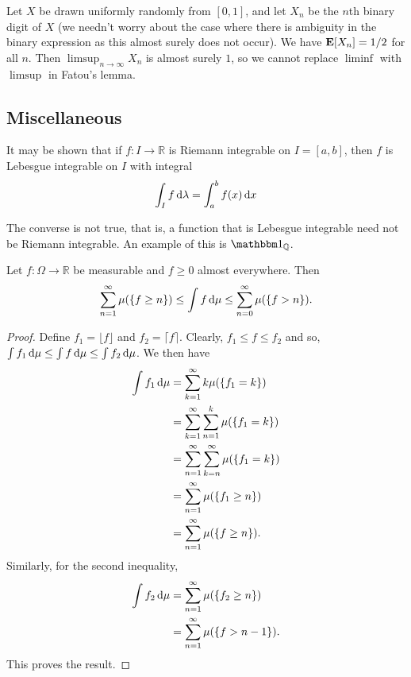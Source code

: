 Let $X$ be drawn uniformly randomly from $[0,1]$, and let $X_n$ be the $n$th binary digit of $X$ (we needn't worry about the case where there is ambiguity in the binary expression as this almost surely does not occur). We have $\textbf{E}
[X_n]=1/2$ for all $n$. Then $\limsup_{n\to\infty}X_n$ is almost surely $1$, so we cannot replace $\liminf$ with $\limsup$ in Fatou's lemma.

\subsection{Miscellaneous}

It may be shown that if $f:I\to\mathbb{R}$ is Riemann integrable on $I=[a,b]$, then $f$ is Lebesgue integrable on $I$ with integral
$$\int_I f\operatorname{d}\!{\lambda} = \int_a^b f(x)\operatorname{d}\!{x}$$

The converse is not true, that is, a function that is Lebesgue integrable need not be Riemann integrable. An example of this is $\indic_\mathbb{Q}$.

\begin{theorem}
\label{geq leq int leq g}
    Let $f:\Omega\to\mathbb{R}$ be measurable and $f\geq 0$ almost everywhere. Then
    $$\sum_{n=1}^\infty \mu(\{f\geq n\})\leq \int f\operatorname{d}\!{\mu} \leq \sum_{n=0}^\infty \mu(\{f>n\}).$$
\end{theorem}
\begin{proof}
    Define $f_1=\lfloor f\rfloor$ and $f_2=\lceil f\rceil$. Clearly, $f_1\leq f\leq f_2$ and so, $\int f_1\operatorname{d}\!{\mu}\leq \int f\operatorname{d}\!{\mu}\leq \int f_2\operatorname{d}\!{\mu}$. We then have
    \begin{align*}
        \int f_1\operatorname{d}\!{\mu} &= \sum_{k=1}^\infty k\mu(\{f_1=k\}) \\
        &= \sum_{k=1}^\infty \sum_{n=1}^k \mu(\{f_1=k\}) \\
        &= \sum_{n=1}^\infty \sum_{k=n}^\infty \mu(\{f_1=k\}) \\
        &= \sum_{n=1}^\infty \mu(\{f_1\geq n\}) \\
        &= \sum_{n=1}^\infty \mu(\{f\geq n\}).
    \end{align*}
    Similarly, for the second inequality,
    \begin{align*}
        \int f_2\operatorname{d}\!{\mu} &= \sum_{n=1}^\infty \mu(\{f_2\geq n\}) \\
        &= \sum_{n=1}^\infty \mu(\{f> n-1\}).
    \end{align*}
    This proves the result.
\end{proof}

